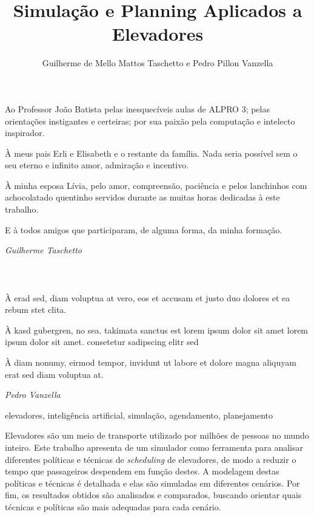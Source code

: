 \documentclass[portuguese,oneside]{tcc}
\author{Guilherme de Mello Mattos Taschetto e Pedro Pillon Vanzella}
\title{Simulação e Planning Aplicados a Elevadores}
      {Simulation and Planning Applied to Elevators}
\begin{document}

\begin{agradecimentos}

Ao Professor João Batista pelas inesquecíveis aulas de ALPRO 3; pelas
orientações instigantes e certeiras; por sua paixão pela computação e intelecto
inspirador.

À meus pais Erli e Elisabeth e o restante da família. Nada seria possível sem o
seu eterno e infinito amor, admiração e incentivo.

À minha esposa Lívia, pelo amor, compreensão, paciência e pelos lanchinhos com
achocolatado quentinho servidos durante as muitas horas dedicadas à este trabalho.

E à todos amigos que participaram, de alguma forma, da minha formação.

\hfill \textit{Guilherme Taschetto} \\ \\ \\ \\

À erad sed, diam voluptua at vero, eos et accusam et justo duo
dolores et ea rebum stet clita.

À kasd gubergren, no sea. takimata sanctus est lorem ipsum dolor sit
amet lorem ipsum dolor sit amet. consetetur sadipscing elitr sed

À diam nonumy, eirmod tempor, invidunt ut labore et dolore magna
aliquyam erat sed diam voluptua at.

\hfill \textit{Pedro Vanzella}
\end{agradecimentos}

\begin{resumo}{elevadores, inteligência artificial, simulação, agendamento, planejamento}

Elevadores são um meio de transporte utilizado por milhões de pessoas no mundo
inteiro. Este trabalho apresenta de um simulador como ferramenta para analisar
diferentes políticas e técnicas de \textit{scheduling} de elevadores, de modo a
reduzir o tempo que passageiros despendem em função destes. A modelagem destas
políticas e técnicas é detalhada e elas são simuladas em diferentes cenários.
Por fim, os resultados obtidos são analisados e comparados, buscando orientar
quais técnicas e políticas são mais adequadas para cada cenário.

\end{resumo}
\end{document}
